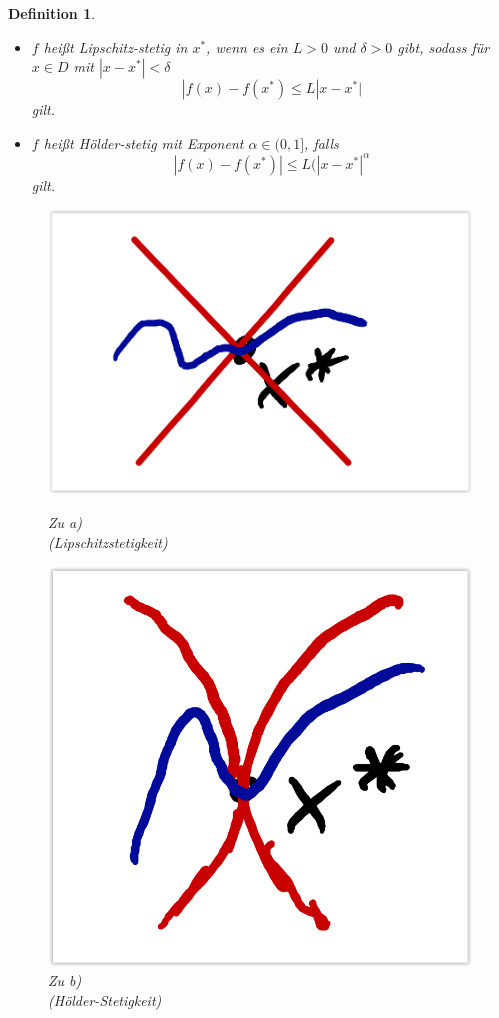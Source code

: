 \documentclass[12pt,a4paper]{article}%
\newtheorem{definition}[satz]{Definition}
\numberwithin{equation}{section}
\numberwithin{equation}{subsection}
\begin{document}
  \begin{definition}
    \begin{itemize}
      \item[a) ] $f$ heißt Lipschitz-stetig in $x^*$, wenn es ein $L > 0$ und $\delta > 0$ gibt, sodass für $x \in D$ mit $|x-x^*| < \delta$
	      \begin{equation}
	        |f(x) - f(x^*) \leq L|x-x^*|
	      \end{equation}
	      gilt.
      \item[b) ] $f$ heißt Hölder-stetig mit Exponent $\alpha \in (0,1]$, falls
	      \begin{equation}
	        |f(x) - f(x^*)| \leq L(|x-x^*|^\alpha
	      \end{equation}
	      gilt.
    \end{itemize}
    \begin{figure}[H] 
			\centering
			\begin{minipage}{.5\textwidth}
			  \centering
			  \captionsetup{justification=centering}
			  \includegraphics[width=0.9\linewidth]{stetigkeit_lipschitz.png}
			  \caption{Zu a) \\ (Lipschitzstetigkeit) \protect\cite{HM12}}
			  \label{fig:stetigkeit_lipschitz}
			\end{minipage}%
			\begin{minipage}{.5\textwidth}
			  \centering
			  \captionsetup{justification=centering}
			  \includegraphics[width=0.65\linewidth]{stetigkeit_hoelder.png}
			  \caption{Zu b) \\ (Hölder-Stetigkeit) \protect\cite{HM12}}
			  \label{fig:stetigkeit_hoelder}
			\end{minipage}
    \end{figure}
  \end{definition}
\end{document}
